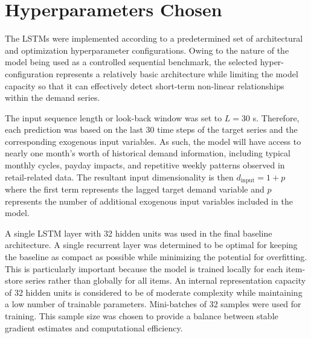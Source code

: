 \section{Hyperparameters Chosen} 
\label {sec:lstm_hyper_parameters_chosen}

The LSTMs were implemented according to a predetermined set of architectural and optimization hyperparameter configurations. Owing to the nature of the model being used as a controlled sequential benchmark, the selected hyper-configuration represents a relatively basic architecture while limiting the model capacity so that it can effectively detect short-term non-linear relationships within the demand series.

The input sequence length or look-back window was set to $L = 30$ s. Therefore, each prediction was based on the last 30 time steps of the target series and the corresponding exogenous input variables. As such, the model will have access to nearly one month’s worth of historical demand information, including typical monthly cycles, payday impacts, and repetitive weekly patterns observed in retail-related data. The resultant input dimensionality is then $d_{\text{input}} = 1 + p$ where the first term represents the lagged target demand variable and $p$ represents the number of additional exogenous input variables included in the model.

A single LSTM layer with 32 hidden units was used in the final baseline architecture. A single recurrent layer was determined to be optimal for keeping the baseline as compact as possible while minimizing the potential for overfitting. This is particularly important because the model is trained locally for each item-store series rather than globally for all items. An internal representation capacity of 32 hidden units is considered to be of moderate complexity while maintaining a low number of trainable parameters.
Mini-batches of 32 samples were used for training. This sample size was chosen to provide a balance between stable gradient estimates and computational efficiency.

